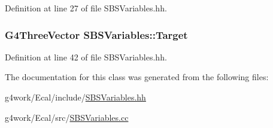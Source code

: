 Definition at line 27 of file S\-B\-S\-Variables.\-hh.

\hypertarget{class_s_b_s_variables_a3c76a8b893d04a78ff94f46cc80a7932}{
\subsubsection[{Target}]{\setlength{\rightskip}{0pt plus 5cm}G4\-Three\-Vector S\-B\-S\-Variables\-::\-Target}}\label{class_s_b_s_variables_a3c76a8b893d04a78ff94f46cc80a7932}


Definition at line 42 of file S\-B\-S\-Variables.\-hh.



The documentation for this class was generated from the following files\-:\begin{DoxyCompactItemize}
\item 
g4work/\-Ecal/include/\hyperlink{_s_b_s_variables_8hh}{S\-B\-S\-Variables.\-hh}\item 
g4work/\-Ecal/src/\hyperlink{_s_b_s_variables_8cc}{S\-B\-S\-Variables.\-cc}\end{DoxyCompactItemize}
